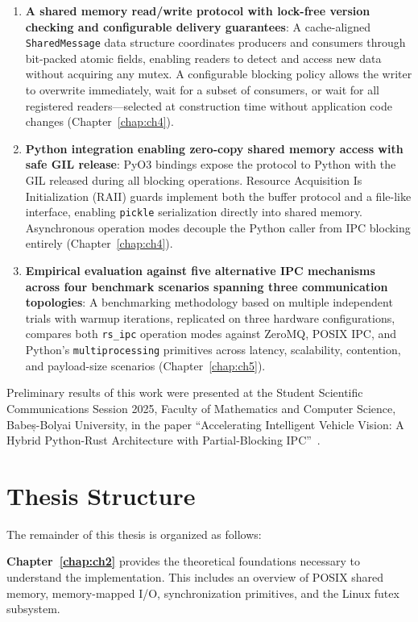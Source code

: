\begin{enumerate}
    \item \textbf{A shared memory read/write protocol with lock-free version checking and configurable delivery guarantees}: A cache-aligned \texttt{SharedMessage} data structure coordinates producers and consumers through bit-packed atomic fields, enabling readers to detect and access new data without acquiring any mutex. A configurable blocking policy allows the writer to overwrite immediately, wait for a subset of consumers, or wait for all registered readers---selected at construction time without application code changes (Chapter~\ref{chap:ch4}).

    \item \textbf{Python integration enabling zero-copy shared memory access with safe GIL release}: PyO3 bindings expose the protocol to Python with the GIL released during all blocking operations. Resource Acquisition Is Initialization (RAII) guards implement both the buffer protocol and a file-like interface, enabling \texttt{pickle} serialization directly into shared memory. Asynchronous operation modes decouple the Python caller from IPC blocking entirely (Chapter~\ref{chap:ch4}).

    \item \textbf{Empirical evaluation against five alternative IPC mechanisms across four benchmark scenarios spanning three communication topologies}: A benchmarking methodology based on multiple independent trials with warmup iterations, replicated on three hardware configurations, compares both \texttt{rs\_ipc} operation modes against ZeroMQ, POSIX IPC, and Python's \texttt{multiprocessing} primitives across latency, scalability, contention, and payload-size scenarios (Chapter~\ref{chap:ch5}).
\end{enumerate}

Preliminary results of this work were presented at the Student Scientific Communications Session 2025, Faculty of Mathematics and Computer Science, Babeș-Bolyai University, in the paper ``Accelerating Intelligent Vehicle Vision: A Hybrid Python-Rust Architecture with Partial-Blocking IPC''~\cite{szilagyi2025accelerating}.

\section{Thesis Structure}

The remainder of this thesis is organized as follows:

\textbf{Chapter~\ref{chap:ch2}} provides the theoretical foundations necessary to understand the implementation. This includes an overview of POSIX shared memory, memory-mapped I/O, synchronization primitives, and the Linux futex subsystem.

